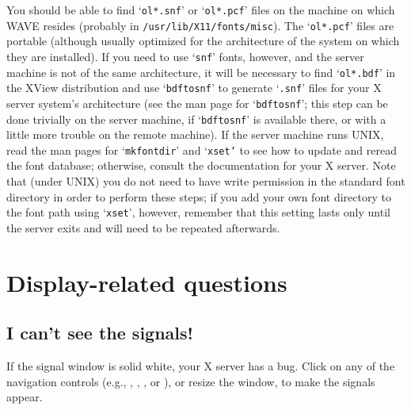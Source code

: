 \documentclass[twoside]{book}
\newcommand{\button}[1]{\cornersize{2}\ovalbox{\rule[-.3mm]{0cm}{2.5mm}\small\sf ~#1~}}
\newcommand{\WAVE}{{\sf WAVE}\xspace}
\begin{document}
You should be able to find `{\tt ol*.snf}' or `{\tt ol*.pcf}' files on the
machine on which \WAVE{} resides (probably in {\tt /usr/lib/X11/fonts/misc}).
The `{\tt ol*.pcf}' files are portable (although usually optimized for the
architecture of the system on which they are installed).  If you need to use
`{\tt snf}' fonts, however, and the server machine is not of the same
architecture, it will be necessary to find `{\tt ol*.bdf}' in the XView
distribution and use `{\tt bdftosnf}' to generate `{\tt .snf}' files
for your X server system's architecture (see the man page for `{\tt bdftosnf}';
this step can be done trivially on the server machine, if `{\tt bdftosnf}' is
available there, or with a little more trouble on the remote machine).  If the
server machine runs UNIX, read the man pages for `{\tt mkfontdir}' and
`{\tt xset'} to see how to update and reread the font database; otherwise,
consult the documentation for your X server.  Note that (under UNIX) you do
not need to have write permission in the standard font directory in order to
perform these steps; if you add your own font directory to the font path using
`{\tt xset}', however, remember that this setting lasts only until the server
exits and will need to be repeated afterwards.

\section{Display-related questions}

\subsection{I can't see the signals!}

\label{faq:cannot-see-signals}
If the signal window is solid white, your X server has a bug.  Click on any of
the navigation controls (e.g., \button{\tt <<}, \button{\tt <}, \button{\tt >},
or \button{\tt >>}), or resize the window, to make the signals appear.
\end{document}
